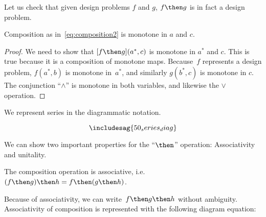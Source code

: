 Let us check that given design problems $f$ and $g$, $f\then g$ is in fact a design problem.
\begin{lemma}
    Composition as in~\cref{eq:composition2} is monotone in $a$ and $c$.
\end{lemma}
\begin{proof}
 We need to show that $[f\then g](a^*,c)$ is monotone in $a^*$ and $c$. This is true
 because it is a composition of monotone maps. Because~$f$ represents a design problem, $f(a^*,b)$ is monotone in~$a^*$,
 and similarly $g(b^*,c)$  is monotone in $c$. The conjunction ``$\wedge$'' is monotone in both variables, and likewise the $\vee$ operation.
 \end{proof}

We represent series in the diagrammatic notation.

\begin{equation}
\includesag{50_series_diag}
\end{equation}

We can show two important properties for the ``$\then$'' operation: Associativity and unitality.

\begin{lemma}
    The composition operation is associative, i.e. $(f\then g)\then h = f\then (g\then h)$.
\end{lemma}

Because of associativity, we can write~$f\then g\then h$ without ambiguity.
Associativity of composition is represented with the following diagram equation:


